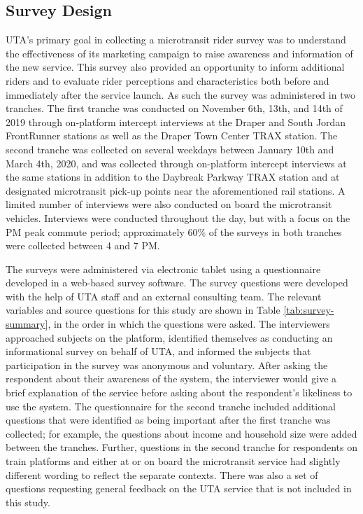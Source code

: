 \documentclass[smartcities,article,submit,moreauthors,pdftex]{Definitions/mdpi}
\begin{document}
\subsection{Survey Design}
UTA’s primary goal in collecting a microtransit rider survey was to understand the effectiveness of its marketing campaign to raise awareness and information of the new service. This survey also provided an opportunity to inform additional riders and to evaluate rider perceptions and characteristics both before and immediately after the service launch. As such the survey was administered in two tranches. The first tranche was conducted on November 6th, 13th, and 14th of 2019 through on-platform intercept interviews at the Draper and South Jordan FrontRunner stations as well as the Draper Town Center TRAX station. The second tranche was collected on several weekdays between January 10th and March 4th, 2020, and was collected through on-platform intercept interviews at the same stations in addition to the Daybreak Parkway TRAX station and at designated microtransit pick-up points near the aforementioned rail stations. A limited number of interviews were also conducted on board the microtransit vehicles. Interviews were conducted throughout the day, but with a focus on the PM peak commute period; approximately 60\% of the surveys in both tranches were collected between 4 and 7 PM.

The surveys were administered via electronic tablet using a questionnaire developed in a web-based survey software. The survey questions were developed with the help of UTA staff and an external consulting team. The relevant variables and source questions for this study are shown in Table \ref{tab:survey-summary}, in the order in which the questions were asked. The interviewers approached subjects on the platform, identified themselves as conducting an informational survey on behalf of UTA, and informed the subjects that participation in the survey was anonymous and voluntary. After asking the respondent about their awareness of the system, the interviewer would give a brief explanation of the service before asking about the respondent’s likeliness to use the system. The questionnaire for the second tranche included additional questions that were identified as being important after the first tranche was collected; for example, the questions about income and household size were added between the tranches. Further, questions in the second tranche for respondents on train platforms and either at or on board the microtransit service had slightly different wording to reflect the separate contexts. There was also a set of questions requesting general feedback on the UTA service that is not included in this study.
\end{document}
